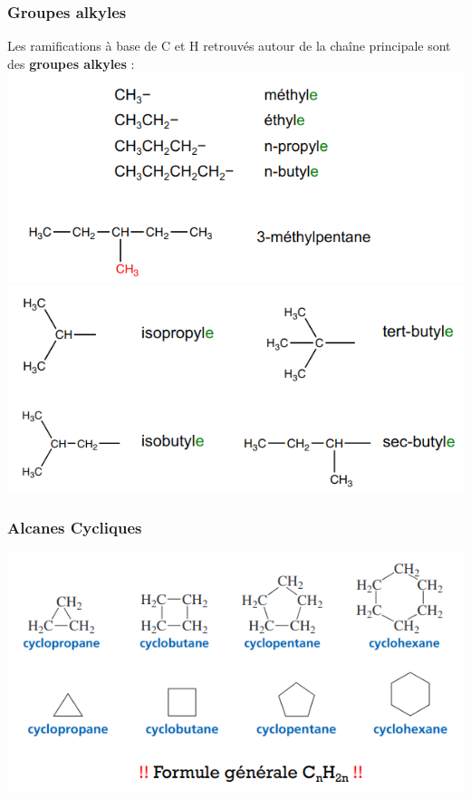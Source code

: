 \documentclass{article}
\begin{document}
        \subsubsection{Groupes alkyles}
            Les ramifications à base de C et H retrouvés autour de la chaîne principale sont des \textbf{groupes alkyles} :\\
            \includegraphics[scale=.4]{groupes_alkyles.png}
            \includegraphics[scale=.4]{groupes_alkyles_particuliers.png}

        \subsubsection{Alcanes Cycliques}
            \includegraphics[scale=.7]{alcanes_cycliques.png}
        
\end{document}
